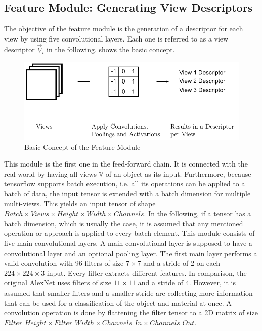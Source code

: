 \subsection{Feature Module: Generating View Descriptors}
\label{sec:architecture-feature-module}
The objective of the feature module is the generation of a descriptor for each view by using five convolutional layers.
Each one is referred to as a view descriptor $\vec{V}_i$ in the following.
 shows the basic concept.
\begin{figure}
	\centering
	\includegraphics[]{images/feature_module.pdf}
	\caption{Basic Concept of the Feature Module}
	\label{fig:feature-module}
\end{figure}
This module is the first one in the feed-forward chain.
It is connected with the real world by having all views $\mathbb{V}$ of an object as its input.
Furthermore, because tensorflow supports batch execution, i.e. all its operations can be applied to a batch of data, the input tensor is extended with a batch dimension for multiple multi-views.
This yields an input tensor of shape $Batch \times Views \times Height \times Width \times Channels$.
In the following, if a tensor has a batch dimension, which is usually the case, it is assumed that any mentioned operation or approach is applied to every batch element.
This module consists of five main convolutional layers.
A main convolutional layer is supposed to have a convolutional layer and an optional pooling layer.
The first main layer performs a valid convolution with 96 filters of size $7 \times 7$ and a stride of 2 on each $224 \times 224 \times 3$ input.
Every filter extracts different features.
In comparison, the original AlexNet uses filters of size $11 \times 11$ and a stride of 4.
However, it is assumed that smaller filters and a smaller stride are collecting more information that can be used for a classification of the object and material at once.
A convolution operation is done by flattening the filter tensor to a 2D matrix of size $Filter\_Height \times Filter\_Width \times Channels\_In \times Channels\_Out$.
